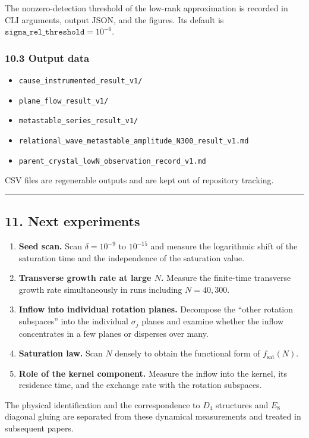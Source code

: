 \documentclass[
  a4paper,
]{article}
\providecommand{\tightlist}{%
  \setlength{\itemsep}{0pt}\setlength{\parskip}{0pt}}
\begin{document}
The nonzero-detection threshold of the low-rank approximation is
recorded in CLI arguments, output JSON, and the figures. Its default is
\(\texttt{sigma\_rel\_threshold}=10^{-6}\).

\subsubsection{10.3 Output data}\label{output-data}

\begin{itemize}
\tightlist
\item
  \texttt{cause\_instrumented\_result\_v1/}
\item
  \texttt{plane\_flow\_result\_v1/}
\item
  \texttt{metastable\_series\_result\_v1/}
\item
  \texttt{relational\_wave\_metastable\_amplitude\_N300\_result\_v1.md}
\item
  \texttt{parent\_crystal\_lowN\_observation\_record\_v1.md}
\end{itemize}

CSV files are regenerable outputs and are kept out of repository
tracking.

\begin{center}\rule{0.5\linewidth}{0.5pt}\end{center}

\subsection{11. Next experiments}\label{next-experiments}

\begin{enumerate}
\def\labelenumi{\arabic{enumi}.}
\item
  \textbf{Seed scan.} Scan \(\delta=10^{-9}\) to \(10^{-15}\) and
  measure the logarithmic shift of the saturation time and the
  independence of the saturation value.
\item
  \textbf{Transverse growth rate at large \(N\).} Measure the
  finite-time transverse growth rate simultaneously in runs including
  \(N=40, 300\).
\item
  \textbf{Inflow into individual rotation planes.} Decompose the ``other
  rotation subspaces'' into the individual \(\sigma_j\) planes and
  examine whether the inflow concentrates in a few planes or disperses
  over many.
\item
  \textbf{Saturation law.} Scan \(N\) densely to obtain the functional
  form of \(f_{\mathrm{sat}}(N)\).
\item
  \textbf{Role of the kernel component.} Measure the inflow into the
  kernel, its residence time, and the exchange rate with the rotation
  subspaces.
\end{enumerate}

The physical identification and the correspondence to \(D_4\) structures
and \(E_8\) diagonal gluing are separated from these dynamical
measurements and treated in subsequent papers.
\end{document}
